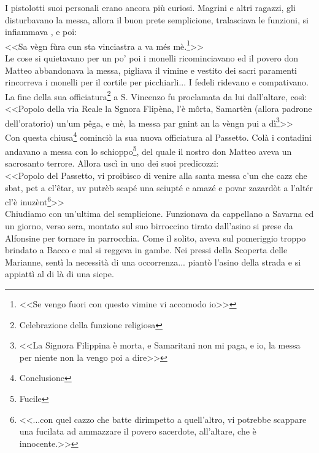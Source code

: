 I pistolotti suoi personali erano ancora più curiosi. Magrini e altri ragazzi, gli disturbavano la messa, allora il buon prete semplicione, tralasciava le funzioni, si infiammava , e poi:\\
\indent <<Sa vègn fùra cun sta vinciastra a va més mè.\footnote{<<Se vengo fuori con questo vimine vi accomodo io>>}>>\\
\indent Le cose si quietavano per un po' poi i monelli ricominciavano ed il povero don Matteo abbandonava la messa, pigliava il vimine e vestito dei sacri paramenti rincorreva i monelli per il cortile per picchiarli... I fedeli ridevano e compativano. \\
La fine della sua officiatura\footnote{Celebrazione della funzione religiosa} a S. Vincenzo fu proclamata da lui dall'altare, così:\\
\indent <<Popolo della via Reale la Sgnora Flipèna, l'è môrta, Samartèn (allora padrone dell'oratorio) un'um pêga, e mè, la messa par gnint an la vèngn pui a dì\footnote{<<La Signora Filippina è morta, e Samaritani non mi paga, e io, la messa per niente non la vengo poi a dire>>}>>\\
Con questa chiusa\footnote{Conclusione} cominciò la sua nuova officiatura al Passetto. Colà i contadini andavano a messa con lo schioppo\footnote{Fucile}, del quale il nostro don Matteo aveva un sacrosanto terrore. Allora uscì in uno dei suoi predicozzi:\\
\indent <<Popolo del Passetto, vi proibisco di venire alla santa messa c'un che cazz che sbat, pet a cl'êtar, uv putrèb scapé una sciupté e amazé e povar zazardòt a l'altér cl'è inuzènt\footnote{<<...con quel cazzo che batte dirimpetto a quell'altro, vi potrebbe scappare una fucilata ad ammazzare il povero sacerdote, all'altare, che è innocente.>>}>>\\

Chiudiamo con un'ultima del semplicione. Funzionava da cappellano a Savarna ed un giorno, verso sera, montato sul suo birroccino tirato dall'asino si prese da Alfonsine per tornare in parrocchia. Come il solito, aveva sul pomeriggio troppo brindato a Bacco e mal si reggeva in gambe. Nei pressi della Scoperta delle Marianne, sentì la necessità di una occorrenza... piantò l'asino della strada e si appiattì al di là di una siepe.

